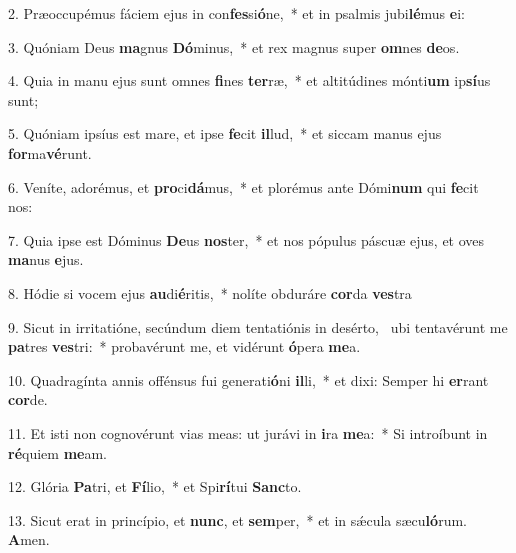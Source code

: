 2. Præoccupémus fáciem ejus in con\textbf{fes}si\textbf{ó}ne,~*  et in psalmis jubi\textbf{lé}mus \textbf{e}i:\

3. Quóniam Deus \textbf{ma}gnus \textbf{Dó}minus,~*  et rex magnus super \textbf{om}nes \textbf{de}os.\

4. Quia in manu ejus sunt omnes \textbf{fi}nes \textbf{ter}ræ,~*  et altitúdines mónti\textbf{um} ip\textbf{sí}us sunt;\

5. Quóniam ipsíus est mare, et ipse \textbf{fe}cit \textbf{il}lud,~*  et siccam manus ejus \textbf{for}ma\textbf{vé}runt.\

6. Veníte, adorémus, et \textbf{pro}ci\textbf{dá}mus,~*  et plorémus ante Dómi\textbf{num} qui \textbf{fe}cit nos:\

7. Quia ipse est Dóminus \textbf{De}us \textbf{nos}ter,~*  et nos pópulus páscuæ ejus, et oves \textbf{ma}nus \textbf{e}jus.\

8. Hódie si vocem ejus \textbf{au}di\textbf{é}ritis,~*  nolíte obduráre \textbf{cor}da \textbf{ves}tra\

9. Sicut in irritatióne, secúndum diem tentatiónis in desérto, \dag\  ubi tentavérunt me \textbf{pa}tres \textbf{ves}tri:~*  probavérunt me, et vidérunt \textbf{ó}pera \textbf{me}a.\

10. Quadragínta annis offénsus fui generati\textbf{ó}ni \textbf{il}li,~*  et dixi: Semper hi \textbf{er}rant \textbf{cor}de.\

11. Et isti non cognovérunt vias meas: ut jurávi in \textbf{i}ra \textbf{me}a:~*  Si introíbunt in \textbf{ré}quiem \textbf{me}am.\

12. Glória \textbf{Pa}tri, et \textbf{Fí}lio,~*  et Spi\textbf{rí}tui \textbf{Sanc}to.\

13. Sicut erat in princípio, et \textbf{nunc}, et \textbf{sem}per,~*  et in sǽcula sæcu\textbf{ló}rum. \textbf{A}men.\

